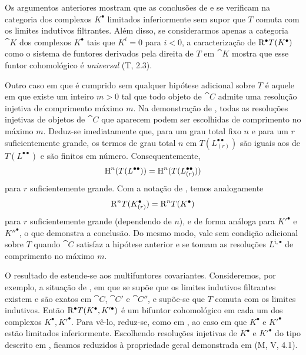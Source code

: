 \begin{remark}[11.5.4]
\label{0.11.5.4}
Os argumentos anteriores mostram que as conclusões de  e  se verificam na categoria dos complexos $K^\bullet$ limitados inferiormente sem supor que $T$ comuta com os limites indutivos filtrantes.
Além disso, se considerarmos apenas a categoria $\cat{K}$ dos complexos $K^\bullet$ tais que $K^i=0$ para $i<0$, a caracterização de $\mathrm{R}^\bullet T(K^\bullet)$ como o sistema de funtores derivados pela direita de $T$ em $\cat{K}$ mostra que esse funtor cohomológico é \emph{universal} (T, 2.3).

Outro caso em que  é cumprido sem qualquer hipótese adicional sobre $T$ é aquele em que existe um inteiro $m>0$ tal que todo objeto de $\cat{C}$ admite uma resolução injetiva de comprimento máximo $m$.
Na demonstração de , todas as resoluções injetivas de objetos de $\cat{C}$ que aparecem podem ser escolhidas de comprimento no máximo $m$.
Deduz-se imediatamente que, para um grau total fixo $n$ e para um $r$ suficientemente grande, os termos de grau total $n$ em $T(L^{\bullet\bullet}_{(r)})$ são iguais aos de $T(L^{\bullet\bullet})$ e são finitos em número.
Consequentemente,
\[
  \mathrm{H}^n(T(L^{\bullet\bullet}))
  =\mathrm{H}^n(T(L^{\bullet\bullet}_{(r)}))
\]
para $r$ suficientemente grande.
Com a notação de , temos analogamente
\[
  \mathrm{R}^nT(K^\bullet_{(r)})=\mathrm{R}^nT(K^\bullet)
\]
para $r$ suficientemente grande (dependendo de $n$), e de forma análoga para $K'^\bullet$ e $K''^\bullet$, o que demonstra a conclusão.
Do mesmo modo,  vale sem condição adicional sobre $T$ quando $\cat{C}$ satisfaz a hipótese anterior e se tomam as resoluções $L^{i,\bullet}$ de comprimento no máximo $m$.
\end{remark}

\begin{env}[11.5.5]
\label{0.11.5.5}
O resultado de  estende-se aos multifuntores covariantes.
Consideremos, por exemplo, a situação de , em que se supõe que os limites indutivos filtrantes existem e são exatos em $\cat{C}$, $\cat{C}'$ e $\cat{C}''$,
e supõe-se que $T$ comuta com os limites indutivos.
Então $\mathrm{R}^\bullet T(K^\bullet,K'^\bullet)$ é um bifuntor cohomológico em cada um dos complexos $K^\bullet,K'^\bullet$.
Para vê-lo, reduz-se, como em , ao caso em que $K^\bullet$ e $K'^\bullet$ estão limitados inferiormente.
Escolhendo resoluções injetivas de $K^\bullet$ e $K'^\bullet$ do tipo descrito em , ficamos reduzidos à propriedade geral demonstrada em (M, V, 4.1).
\end{env}

